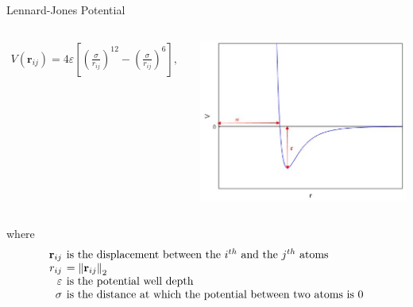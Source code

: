\documentclass{beamer}
\renewcommand{\vec}[1]{\mathbf{#1}}
\begin{document}
\begin{frame}{Lennard-Jones Potential}
\begin{columns}
	\begin{align*}
		V\left(\vec{r}_{ij}\right) = 4\varepsilon \left[ \left( \frac{\sigma}{r_{ij}}\right)^{12} - \left( \frac{\sigma}{r_{ij}}\right)^{6} \right],
	\end{align*}

	\centering
	\includegraphics[scale=0.40]{lennard-jones_potential_graph}
\end{columns}
where
$$
\arraycolsep=2pt
\begin{array}{rl}
	\vec{r}_{ij} &\mbox{is the displacement between the $i^{th}$ and the $j^{th}$ atoms} \\
	r_{ij} &= \left\Vert\vec{r}_{ij}\right\Vert_{2} \\
	\varepsilon & \mbox{is the potential well depth} \\
	\sigma & \mbox{is the distance at which the potential between two atoms is 0}
\end{array}
$$
\end{frame}
\end{document}
